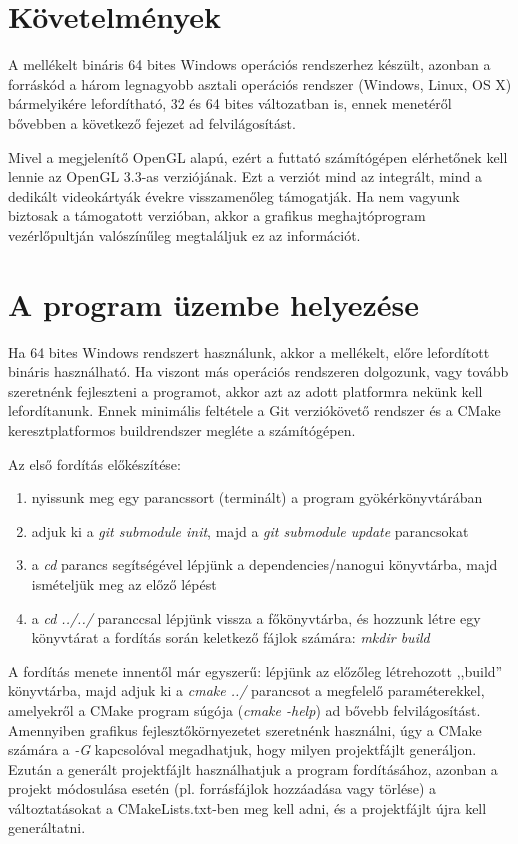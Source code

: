 
\section{Követelmények}

A mellékelt bináris 64 bites Windows operációs rendszerhez készült, azonban a forráskód a három legnagyobb asztali operációs rendszer (Windows, Linux, OS X) bármelyikére lefordítható, 32 és 64 bites változatban is, ennek menetéről bővebben a következő fejezet ad felvilágosítást.

Mivel a megjelenítő OpenGL alapú, ezért a futtató számítógépen elérhetőnek kell lennie az OpenGL 3.3-as verziójának. Ezt a verziót mind az integrált, mind a dedikált videokártyák évekre visszamenőleg támogatják. Ha nem vagyunk biztosak a támogatott verzióban, akkor a grafikus meghajtóprogram vezérlőpultján valószínűleg megtaláljuk ez az információt.

\section{A program üzembe helyezése}

Ha 64 bites Windows rendszert használunk, akkor a mellékelt, előre lefordított bináris használható. Ha viszont más operációs rendszeren dolgozunk, vagy tovább szeretnénk fejleszteni a programot, akkor azt az adott platformra nekünk kell lefordítanunk. Ennek minimális feltétele a Git verziókövető rendszer és a CMake keresztplatformos buildrendszer megléte a számítógépen.

Az első fordítás előkészítése:

\begin{enumerate}[noitemsep]
\item nyissunk meg egy parancssort (terminált) a program gyökérkönyvtárában
\item adjuk ki a \textit{git submodule init}, majd a \textit{git submodule update} parancsokat
\item a \textit{cd} parancs segítségével lépjünk a dependencies/nanogui könyvtárba, majd ismételjük meg az előző lépést
\item a \textit{cd ../../} paranccsal lépjünk vissza a főkönyvtárba, és hozzunk létre egy könyvtárat a fordítás során keletkező fájlok számára: \textit{mkdir build}
\end{enumerate}

A fordítás menete innentől már egyszerű: lépjünk az előzőleg létrehozott ,,build'' könyvtárba, majd adjuk ki a \textit{cmake ../} parancsot a megfelelő paraméterekkel, amelyekről a CMake program súgója (\textit{cmake -\-help}) ad bővebb felvilágosítást. Amennyiben grafikus fejlesztőkörnyezetet szeretnénk használni, úgy a CMake számára a \textit{-G} kapcsolóval megadhatjuk, hogy milyen projektfájlt generáljon. Ezután a generált projektfájlt használhatjuk a program fordításához, azonban a projekt módosulása esetén (pl. forrásfájlok hozzáadása vagy törlése) a változtatásokat a CMakeLists.txt-ben meg kell adni, és a projektfájlt újra kell generáltatni.

